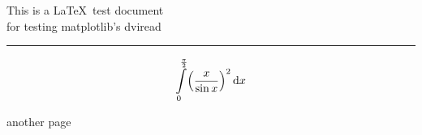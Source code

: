 \documentclass{article}
\begin{document}
This is a \LaTeX\ test document\\
for testing matplotlib's dviread

\noindent\rule{\textwidth}{1pt}

\[ \int\limits_0^{\frac{\pi}{2}} \Bigl(\frac{x}{\sin x}\Bigr)^2\,\mathrm{d}x \]


\newpage
another page
\end{document}
